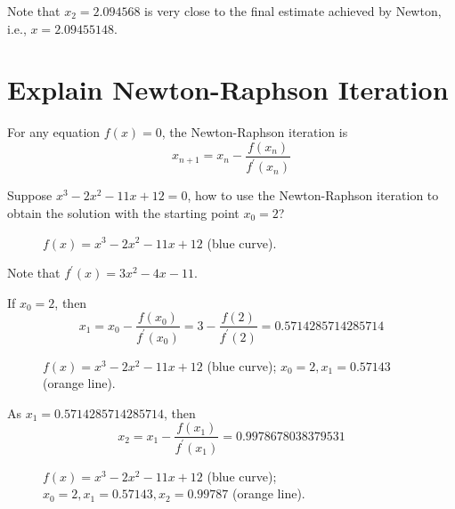 \documentclass[12pt]{article}
\begin{document}
Note that $x_2=2.094568$ is very close to the final estimate achieved by Newton, i.e., $x=2.09455148$.

\clearpage

\section{Explain Newton-Raphson Iteration}

For any equation $f(x)=0$, the Newton-Raphson iteration is
\begin{equation*}
x_{n+1}=x_{n}-\frac{f(x_{n})}{f^\prime(x_{n})}
\end{equation*}

Suppose $x^3-2x^2-11x+12=0$, how to use the Newton-Raphson iteration to obtain the solution with the starting point $x_0=2$?

\begin{figure}[h]
    \centering
    
    \caption{{\color{blue}$f(x)=x^3-2x^2-11x+12$} (blue curve).}
\end{figure}

Note that $f^\prime(x)=3x^2-4x-11$.

If $x_0=2$, then
\begin{equation*}
x_1=x_{0}-\frac{f(x_{0})}{f^\prime(x_{0})}=3-\frac{f(2)}{f^\prime(2)}=0.5714285714285714
\end{equation*}

\begin{figure}[h]
    \centering
    
    \caption{{\color{blue}$f(x)=x^3-2x^2-11x+12$} (blue curve); {\color{orange}$x_0=2,x_1=0.57143$} (orange line).}
\end{figure}

\clearpage

As $x_1=0.5714285714285714$, then
\begin{equation*}
x_2=x_{1}-\frac{f(x_{1})}{f^\prime(x_{1})}=0.9978678038379531
\end{equation*}

\begin{figure}[h]
    \centering
    
    \caption{{\color{blue}$f(x)=x^3-2x^2-11x+12$} (blue curve); {\color{orange}$x_0=2,x_1=0.57143,x_2=0.99787$} (orange line).}
\end{figure}
\end{document}
